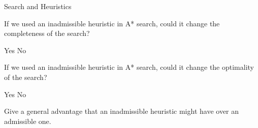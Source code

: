 \begin{problem} {Search and Heuristics}
\begin{question}[2]
If we used an inadmissible heuristic in A* search, could it change the completeness of the search? 

\hspace{5mm}
\solution{\emptycircle}{\OnefYes} Yes
\hspace{5mm}
\solution{\emptycircle}{\OnefNo} No

\solution{}{\OneFReason}
\end{question}

\begin{question}[2]
If we used an inadmissible heuristic in A* search, could it change the optimality of the search? 

\hspace{5mm}
\solution{\emptycircle}{\OnegYes} Yes
\hspace{5mm}
\solution{\emptycircle}{\OnegNo} No

\solution{}{\OneGReason}
\end{question}

\begin{question}[2]
Give a general advantage that an inadmissible heuristic might have over an admissible one.

\end{question}

\end{problem}

